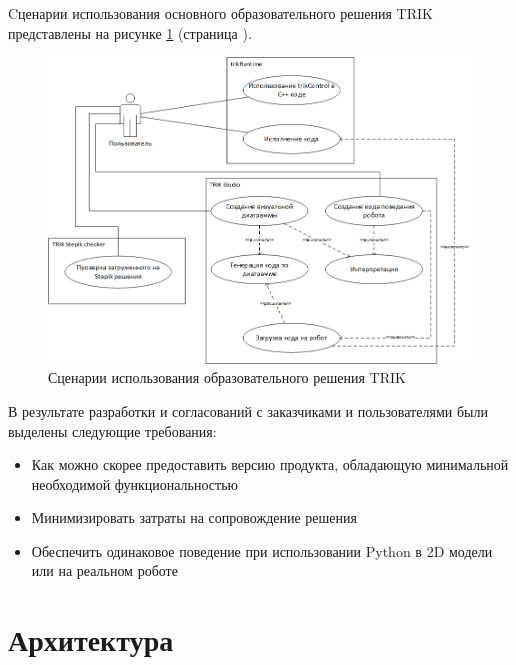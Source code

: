 \documentclass[14pt]{matmex-diploma-custom}
\begin{document}
Cценарии использования основного образовательного решения TRIK представлены на рисунке \ref{usecases} (страница \pageref{usecases}).

\begin{figure}[h]
	\includegraphics[width=\textwidth]{images/diploma-usecase.png}
	\caption{Сценарии использования образовательного решения TRIK}
	\label{usecases}
\end{figure}

В результате разработки и согласований с заказчиками и пользователями были выделены следующие требования:
\begin{itemize}
    \item Как можно скорее предоставить версию продукта, обладающую минимальной необходимой функциональностью
    \item Минимизировать затраты на сопровождение решения
    \item Обеспечить одинаковое поведение при использовании Python в 2D модели или на реальном роботе
\end{itemize}

\section{Архитектура}
\end{document}
